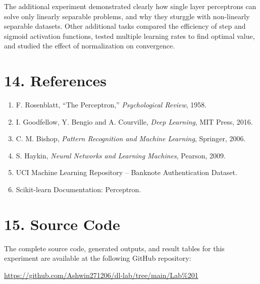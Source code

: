 \documentclass[11pt]{article}
\begin{document}
The additional experiment demonstrated clearly how single layer perceptrons can solve only linearly separable problems, and why they sturggle with non-linearly separable datasets. Other additional tasks compared the efficiency of step and sigmoid activation functions, tested multiple learning rates to find optimal value,  and studied the effect of normalization on convergence.


\section*{14. References}

\begin{enumerate}
\item F. Rosenblatt, ``The Perceptron,'' \emph{Psychological Review}, 1958.
\item I. Goodfellow, Y. Bengio and A. Courville, \emph{Deep Learning}, MIT Press, 2016.
\item C. M. Bishop, \emph{Pattern Recognition and Machine Learning}, Springer, 2006.
\item S. Haykin, \emph{Neural Networks and Learning Machines}, Pearson, 2009.
\item UCI Machine Learning Repository -- Banknote Authentication Dataset.
\item Scikit-learn Documentation: Perceptron.
\end{enumerate}


\section*{15. Source Code}

The complete source code, generated outputs, and result tables for this experiment are available at the following GitHub repository:

\begin{center}
\url{https://github.com/Ashwin271206/dl-lab/tree/main/Lab%201}
\end{center}
\end{document}
